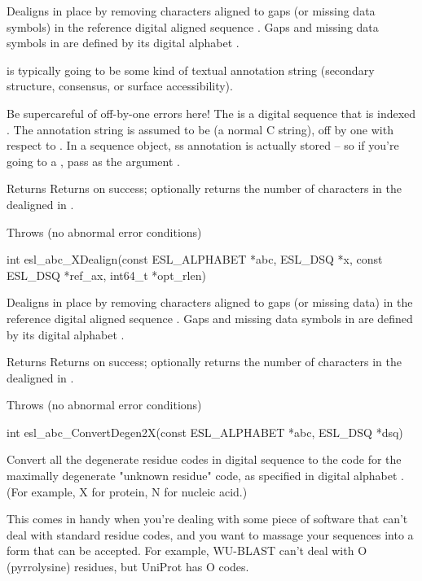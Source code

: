 \begin{sreapi}
Dealigns  in place by removing characters aligned to
gaps (or missing data symbols) in the reference digital
aligned sequence . Gaps and missing data symbols
in  are defined by its digital alphabet .

 is typically going to be some kind of textual
annotation string (secondary structure, consensus, or
surface accessibility).

Be supercareful of off-by-one errors here! The 
is a digital sequence that is indexed . The
annotation string  is assumed to be  (a
normal C string), off by one with respect to .
In a sequence object, ss annotation is actually stored
 -- so if you're going to  a
, pass  as the argument .

Returns Returns  on success; optionally returns the number
of characters in the dealigned  in .

Throws (no abnormal error conditions)


\hypertarget{func:esl_abc_XDealign()}
{\item[int esl\_abc\_XDealign(const ESL\_ALPHABET *abc, ESL\_DSQ *x, const ESL\_DSQ *ref\_ax, int64\_t *opt\_rlen)]}

Dealigns  in place by removing characters aligned to
gaps (or missing data) in the reference digital aligned
sequence . Gaps and missing data symbols in
 are defined by its digital alphabet .

Returns Returns  on success; optionally returns the number
of characters in the dealigned  in .

Throws (no abnormal error conditions)


\hypertarget{func:esl_abc_ConvertDegen2X()}
{\item[int esl\_abc\_ConvertDegen2X(const ESL\_ALPHABET *abc, ESL\_DSQ *dsq)]}

Convert all the degenerate residue codes in digital
sequence  to the code for the maximally degenerate 
"unknown residue" code, as specified in digital alphabet
. (For example, X for protein, N for nucleic acid.)

This comes in handy when you're dealing with some piece
of software that can't deal with standard residue codes,
and you want to massage your sequences into a form that
can be accepted. For example, WU-BLAST can't deal with O
(pyrrolysine) residues, but UniProt has O codes.


\end{sreapi}
